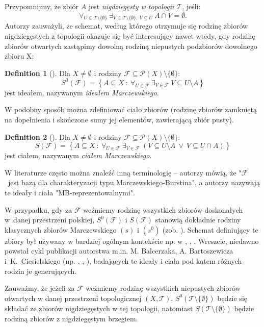 \documentclass{amsart}
\theoremstyle{definition}
\newtheorem{df}{Definition}
\theoremstyle{definition}
\newcommand{\T}{\mathcal{T}}
\DeclareMathOperator{\Exists}{\exists}
\DeclareMathOperator{\Forall}{\forall}
\begin{document}
    \color{teal}

Przypomnijmy, że zbiór $A$ jest \emph{nigdziegęsty w topologii $\T$}, jeśli:
$$\Forall_{U\in\T\setminus\{\emptyset\}}\ \Exists_{V\in\T\setminus\{\emptyset\},\ V\subseteq U}\ A\cap V = \emptyset.$$
Autorzy \cite{MB} zauważyli, że schemat, według którego otrzymuje się rodzinę zbiorów nigdziegęstych z topologii okazuje się być interesujący nawet wtedy, gdy rodzinę zbiorów otwartych zastąpimy dowolną rodziną niepustych podzbiorów dowolnego zbioru X:

\begin{df}[\cite{MB}] Dla $X\neq\emptyset$ i rodziny $\mathcal{F}\subseteq \mathcal{P}(X)\setminus\{\emptyset\}$:
$$S^0(\mathcal{F}) = \left\{A\subseteq X\ :\ \Forall_{U\in\mathcal{F}}\ \Exists_{V\in\mathcal{F}}\ V\subseteq U\setminus A\right\}$$
jest ideałem, nazywanym \emph{ideałem Marczewskiego}.
\end{df}

W podobny sposób można zdefiniować ciało zbiorów (rodzinę zbiorów zamkniętą na dopełnienia i skończone sumy jej elementów, zawierającą zbiór pusty).

\begin{df}[\cite{MB}] Dla $X\neq\emptyset$ i rodziny $\mathcal{F}\subseteq \mathcal{P}(X)\setminus\{\emptyset\}$:
$$S(\mathcal{F}) = \left\{A\subseteq X\ :\ \Forall_{U\in\mathcal{F}}\ \Exists_{V\in\mathcal{F}}\ (V\subseteq U\setminus A\ \vee\ V\subseteq U\cap A)\right\}$$
jest ciałem, nazywanym \emph{ciałem Marczewskiego}.
\end{df}

W literaturze często można znaleźć inną terminologię -- autorzy \cite{BET} mówią, że "$\mathcal{F}$~jest bazą dla charakteryzacji typu Marczewskiego-Burstina", a autorzy \cite{MB2} nazywają te ideały i ciała "MB-reprezentowalnymi".  

W przypadku, gdy za $\mathcal{F}$ weźmiemy rodzinę wszystkich zbiorów doskonałych w~danej przestrzeni polskiej, $S^0(\mathcal{F})$ i $S(\mathcal{F})$ stanowią dokładnie rodziny klasycznych zbiorów Marczewskiego $(s)$ i $(s^0)$ (zob. \cite{Sz}). Schemat definiujący te zbiory był używany w bardziej ogólnym kontekście np. w \cite{Mo}, \cite{Pa}, \cite{Re}. Wreszcie, niedawno powstał cykl publikacji autorstwa m.in. M. Balcerzaka, A. Bartoszewicza i~K.~Ciesielskiego (np. \cite{MB}, \cite{MB2}, \cite{MB3}), badających te ideały i ciała pod kątem różnych rodzin je generujących.

Zauważmy, że jeżeli za $\mathcal{F}$ weźmiemy rodzinę wszystkich niepustych zbiorów otwartych w danej przestrzeni topologicznej $(X,\T)$, $S^0(\T\setminus\{\emptyset\})$ będzie się składać ze zbiorów nigdziegęstych w tej topologii, natomiast $S(\T\setminus\{\emptyset\})$ będzie rodziną zbiorów z nigdziegęstym brzegiem.
\color{black}
\end{document}
